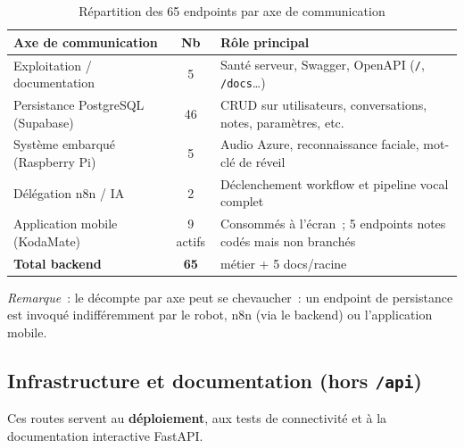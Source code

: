 \documentclass[a4paper,12pt]{report}
\begin{document}
	\begin{table}[htbp]
		\centering
		\caption{Répartition des 65 endpoints par axe de communication}
		\label{tab:ch4-endpoints-synthese}
		\small
		\renewcommand{\arraystretch}{1.25}
		\begin{tabularx}{\textwidth}{|>{\raggedright\arraybackslash}p{3.4cm}|c|>{\raggedright\arraybackslash}X|}
			\hline
			\textbf{Axe de communication} & \textbf{Nb} & \textbf{Rôle principal} \\
			\hline
			Exploitation / documentation &
			5 &
			Santé serveur, Swagger, OpenAPI (\texttt{/}, \texttt{/docs}\ldots) \\
			\hline
			Persistance PostgreSQL (Supabase) &
			46 &
			CRUD sur utilisateurs, conversations, notes, paramètres, etc. \\
			\hline
			Système embarqué (Raspberry Pi) &
			5 &
			Audio Azure, reconnaissance faciale, mot-clé de réveil \\
			\hline
			Délégation n8n / IA &
			2 &
			Déclenchement workflow et pipeline vocal complet \\
			\hline
			Application mobile (KodaMate) &
			9 actifs &
			Consommés à l'écran~; 5 endpoints \og notes \fg{} codés mais non branchés \\
			\hline
			\textbf{Total backend} & \textbf{65} & 60 métier + 5 docs/racine \\
			\hline
		\end{tabularx}
	\end{table}
	
	\noindent\textit{Remarque}~: le décompte par axe peut se chevaucher~: un endpoint de
	persistance est invoqué indifféremment par le robot, n8n (via le backend) ou
	l'application mobile.
	
	\subsection{Infrastructure et documentation (hors \texttt{/api})}
	
	Ces routes servent au \textbf{déploiement}, aux tests de connectivité et à la
	documentation interactive FastAPI.
	
\end{document}
